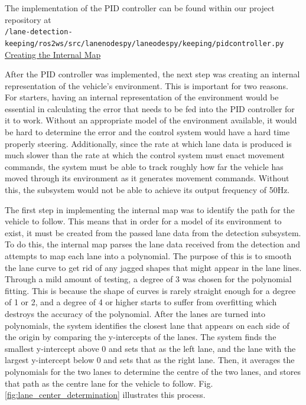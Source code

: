 \documentclass[titlepage,draft]{article}
\begin{document}
{The implementation of the PID controller can be found within our project
repository at \\\texttt{/lane-detection-keeping/ros2\textunderscore ws/src/lane\textunderscore nodes\textunderscore py/lane\textunderscore odes\textunderscore py/keeping/pid\textunderscore controller.py}
\\

\underline{Creating the Internal Map}

After the PID controller was implemented, the next step was creating an internal representation of the vehicle's environment. This is important for two reasons. For starters, having an internal representation of the environment would be essential in calculating the error that needs to be fed into the PID controller for it to work. Without an appropriate model of the environment available, it would be hard to determine the error and the control system would have a hard time properly steering. Additionally, since the rate at which lane data is produced is much slower than the rate at which the control system must enact movement commands, the system must be able to track roughly how far the vehicle has moved through its environment as it generates movement commands. Without this, the subsystem would not be able to achieve its output frequency of 50Hz.

The first step in implementing the internal map was to identify the path for the vehicle to follow. This means that in order for a model of its environment to exist, it must be created from the passed lane data from the detection subsystem. To do this, the internal map parses the lane data received from the detection and attempts to map each lane into a polynomial. The purpose of this is to smooth the lane curve to get rid of any jagged shapes that might appear in the lane lines. Through a mild amount of testing, a degree of 3 was chosen for the polynomial fitting. This is because the shape of curves is rarely straight enough for a degree of 1 or 2, and a degree of 4 or higher starts to suffer from overfitting which destroys the accuracy of the polynomial. After the lanes are turned into polynomials, the system identifies the closest lane that appears on each side of the origin by comparing the y-intercepts of the lanes. The system finds the smallest y-intercept above 0 and sets that as the left lane, and the lane with the largest y-intercept below 0 and sets that as the right lane. Then, it averages the polynomials for the two lanes to determine the centre of the two lanes, and stores that path as the centre lane for the vehicle to follow. Fig. \ref{fig:lane_center_determination} illustrates this process.

}
\end{document}
